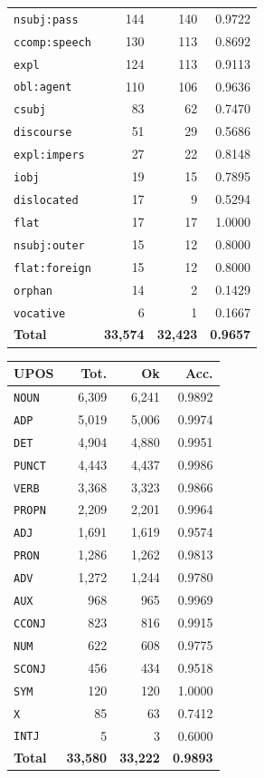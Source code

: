 \begin{table}[ht]
\begin{minipage}[t]{0.55\linewidth}
\begin{tabular}{lrrr}
\texttt{nsubj\!:\!pass} & 144 & 140 & 0.9722 \\
\texttt{ccomp\!:\!speech} & 130 & 113 & 0.8692 \\
\texttt{expl} & 124 & 113 & 0.9113 \\
\texttt{obl\!:\!agent} & 110 & 106 & 0.9636 \\
\texttt{csubj} & 83 & 62 & 0.7470 \\
\texttt{discourse} & 51 & 29 & 0.5686 \\
\texttt{expl\!:\!impers} & 27 & 22 & 0.8148 \\
\texttt{iobj} & 19 & 15 & 0.7895 \\
\texttt{dislocated} & 17 & 9 & 0.5294 \\
\texttt{flat} & 17 & 17 & 1.0000 \\
\texttt{nsubj\!:\!outer} & 15 & 12 & 0.8000 \\
\texttt{flat\!:\!foreign} & 15 & 12 & 0.8000 \\
\texttt{orphan} & 14 & 2 & 0.1429 \\
\texttt{vocative} & 6 & 1 & 0.1667 \\
\midrule
\textbf{Total} & \textbf{33,574} & \textbf{32,423} & \textbf{0.9657} \\
\bottomrule
\end{tabular}
\end{minipage}
\hfill
\begin{minipage}[t]{0.42\linewidth}
\centering\scriptsize
\begin{tabular}{lrrr}
\toprule
\textbf{UPOS} & \textbf{Tot.} & \textbf{Ok} & \textbf{Acc.} \\
\midrule
\texttt{NOUN} & 6,309 & 6,241 & 0.9892 \\
\texttt{ADP} & 5,019 & 5,006 & 0.9974 \\
\texttt{DET} & 4,904 & 4,880 & 0.9951 \\
\texttt{PUNCT} & 4,443 & 4,437 & 0.9986 \\
\texttt{VERB} & 3,368 & 3,323 & 0.9866 \\
\texttt{PROPN} & 2,209 & 2,201 & 0.9964 \\
\texttt{ADJ} & 1,691 & 1,619 & 0.9574 \\
\texttt{PRON} & 1,286 & 1,262 & 0.9813 \\
\texttt{ADV} & 1,272 & 1,244 & 0.9780 \\
\texttt{AUX} & 968 & 965 & 0.9969 \\
\texttt{CCONJ} & 823 & 816 & 0.9915 \\
\texttt{NUM} & 622 & 608 & 0.9775 \\
\texttt{SCONJ} & 456 & 434 & 0.9518 \\
\texttt{SYM} & 120 & 120 & 1.0000 \\
\texttt{X} & 85 & 63 & 0.7412 \\
\texttt{INTJ} & 5 & 3 & 0.6000 \\
\midrule
\textbf{Total} & \textbf{33,580} & \textbf{33,222} & \textbf{0.9893} \\
\bottomrule
\end{tabular}
\end{minipage}
\end{table}
